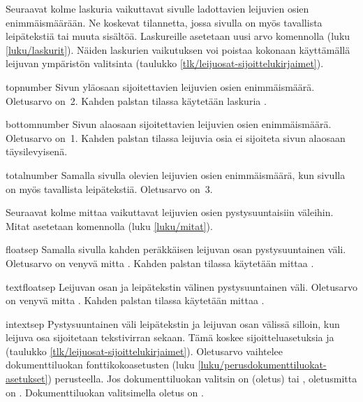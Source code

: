 Seuraavat kolme laskuria vaikuttavat sivulle ladottavien leijuvien osien
enimmäismäärään. Ne koskevat tilannetta, jossa sivulla on myös
tavallista leipätekstiä tai muuta sisältöä. Laskureille asetetaan uusi
arvo komennolla  (luku \ref{luku/laskurit}). Näiden
laskurien vaikutuksen voi poistaa kokonaan käyttämällä leijuvan
ympäristön valitsinta \koodi{!} (taulukko
\ref{tlk/leijuosat-sijoittelukirjaimet}).

\begin{maaritelma}{}
\item [topnumber] Sivun yläosaan sijoitettavien leijuvien osien
  enimmäismäärä. Oletusarvo on~2. Kahden palstan tilassa käytetään
  laskuria .
\item [bottomnumber] Sivun alaosaan sijoitettavien leijuvien osien
  enimmäismäärä. Oletusarvo on~1. Kahden palstan tilassa leijuvia osia
  ei sijoiteta sivun alaosaan täysilevyisenä.
\item [totalnumber] Samalla sivulla olevien leijuvien osien
  enimmäismäärä, kun sivulla on myös tavallista leipätekstiä. Oletusarvo
  on~3.
\end{maaritelma}

Seuraavat kolme mittaa vaikuttavat leijuvien osien pystysuuntaisiin
väleihin. Mitat asetetaan komennolla  (luku
\ref{luku/mitat}).

\begin{maaritelma}{}
\item [floatsep] Samalla sivulla kahden peräkkäisen leijuvan osan
  pystysuuntainen väli. Oletusarvo on venyvä mitta . Kahden palstan tilassa käytetään mittaa
  .
\item [textfloatsep] Leijuvan osan ja leipätekstin välinen
  pystysuuntainen väli. Oletusarvo on venyvä mitta . Kahden palstan tilassa käytetään mittaa
  .
\item [intextsep] Pystysuuntainen väli leipätekstin ja leijuvan osan
  välissä silloin, kun leijuva osa sijoitetaan tekstivirran sekaan. Tämä
  koskee sijoitteluasetuksia  ja  (taulukko
  \ref{tlk/leijuosat-sijoittelukirjaimet}). Oletusarvo vaihtelee
  dokumenttiluokan fonttikokoasetusten (luku
  \ref{luku/perusdokumenttiluokat-asetukset}) perusteella. Jos
  dokumenttiluokan valitsin on \koodi{10pt} (oletus) tai \koodi{11pt},
  oletusmitta on . Dokumenttiluokan
  valitsimella \koodi{12pt} oletus on .
\end{maaritelma}

